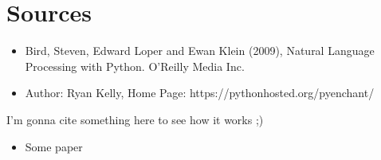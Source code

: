 \documentclass{article}
\begin{document}
\section*{Sources}
\begin{itemize}
	\item Bird, Steven, Edward Loper and Ewan Klein (2009), Natural Language Processing with Python. O’Reilly Media Inc.
	\item Author: Ryan Kelly, Home Page: https://pythonhosted.org/pyenchant/
\end{itemize}


I'm gonna cite something here \cite{greenwade93} to see how it works ;)

\nocite{*}
\printbibliography

\begin{itemize}

\item Some paper
\end{itemize}
\end{document}
